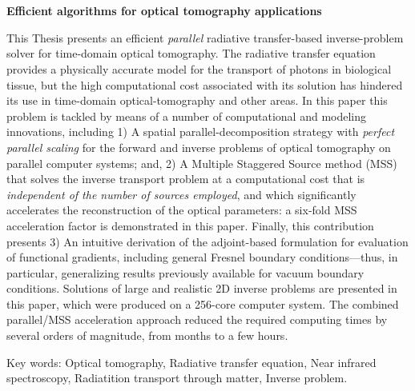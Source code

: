 \pagestyle{empty}
\chapter*{}
\clearpage \pagebreak 
\begin{center}
\begin{large}
\textbf{Efficient algorithms for optical tomography applications}
\end{large}
\end{center}

\vspace{1cm}
This Thesis presents an efficient {\em parallel} radiative
  transfer-based inverse-problem solver for time-domain optical
  tomography. The radiative transfer equation provides a physically
  accurate model for the transport of photons in biological tissue,
  but the high computational cost associated with its solution has
  hindered its use in time-domain optical-tomography and other
  areas. In this paper this problem is tackled by means of a number of
  computational and modeling innovations, including 1) A spatial
  parallel-decomposition strategy with \textit{perfect parallel
    scaling} for the forward and inverse problems of optical
  tomography on parallel computer systems; and, 2) A Multiple
  Staggered Source method (MSS) that solves the inverse transport
  problem at a computational cost that is {\em independent of the
    number of sources employed}, and which significantly accelerates
  the reconstruction of the optical parameters: a six-fold MSS
  acceleration factor is demonstrated in this paper. Finally, this
  contribution presents 3) An intuitive derivation of the
  adjoint-based formulation for evaluation of functional gradients,
  including general Fresnel boundary conditions---thus, in particular,
  generalizing results previously available for vacuum boundary
  conditions. Solutions of large and realistic 2D inverse problems are
  presented in this paper, which were produced on a 256-core computer
  system. The combined parallel/MSS acceleration approach reduced the
  required computing times by several orders of magnitude, from months
  to a few hours.


\vspace{1cm}
\noindent
Key words: 
Optical tomography,
Radiative transfer equation, 
Near infrared spectroscopy, 
Radiatition transport through matter,
Inverse problem.
\pagestyle{empty}
